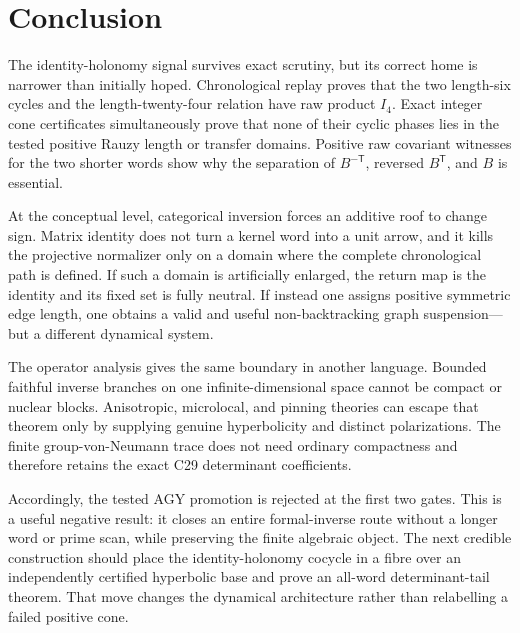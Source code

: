 \section{Conclusion}
\label{sec:conclusion}

The identity-holonomy signal survives exact scrutiny, but its correct home is
narrower than initially hoped.  Chronological replay proves that the two
length-six cycles and the length-twenty-four relation have raw product $I_4$.
Exact integer cone certificates simultaneously prove that none of their
cyclic phases lies in the tested positive Rauzy length or transfer domains.
Positive raw covariant witnesses for the two shorter words show why the
separation of $B^{-\mathsf T}$, reversed $B^{\mathsf T}$, and $B$ is
essential.

At the conceptual level, categorical inversion forces an additive roof to
change sign.  Matrix identity does not turn a kernel word into a unit arrow,
and it kills the projective normalizer only on a domain where the complete
chronological path is defined.  If such a domain is artificially enlarged,
the return map is the identity and its fixed set is fully neutral.  If
instead one assigns positive symmetric edge length, one obtains a valid and
useful non-backtracking graph suspension---but a different dynamical system.

The operator analysis gives the same boundary in another language.  Bounded
faithful inverse branches on one infinite-dimensional space cannot be compact
or nuclear blocks.  Anisotropic, microlocal, and pinning theories can escape
that theorem only by supplying genuine hyperbolicity and distinct
polarizations.  The finite group-von-Neumann trace does not need ordinary
compactness and therefore retains the exact C29 determinant coefficients.

Accordingly, the tested AGY promotion is rejected at the first two
\RouteA{} gates.  This is a useful negative result: it closes an entire
formal-inverse route without a longer word or prime scan, while preserving
the finite algebraic object.  The next credible construction should place the
identity-holonomy cocycle in a fibre over an independently certified
hyperbolic base and prove an all-word determinant-tail theorem.  That move
changes the dynamical architecture rather than relabelling a failed positive
cone.
